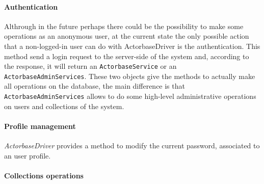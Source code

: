 \documentclass{scalatekids-article}
\begin{document}
\paragraph{Authentication}

Althrough in the future perhaps there could be the possibility to make some
operations as an anonymous user, at the current state the only possible action
that a non-logged-in user can do with ActorbaseDriver is the authentication.
This method send a login request to the server-side of the system and, according
to the response, it will return an \verb=ActorbaseService= or an
\verb=ActorbaseAdminServices=. These two objects give the methods to actually
make all operations on the database, the main difference is that
\verb=ActorbaseAdminServices= allows to do some high-level administrative
operations on users and collections of the system.

\paragraph{Profile management}

\textit{ActorbaseDriver} provides a method to modify the current password,
associated to an user profile.

\paragraph{Collections operations}
\end{document}
